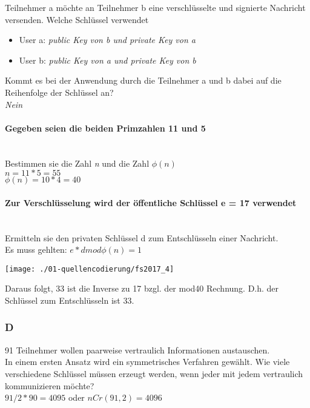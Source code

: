 Teilnehmer a möchte an Teilnehmer b eine verschlüsselte und signierte Nachricht versenden. Welche Schlüssel verwendet
\begin{itemize}
    \item User a: \textit{public Key von b und private Key von a}
    \item User b: \textit{public Key von a und private Key von b}\\
\end{itemize}

Kommt es bei der Anwendung durch die Teilnehmer a und b dabei auf die Reihenfolge der Schlüssel an?\\
\textit{Nein}\\

\paragraph{Gegeben seien die beiden Primzahlen 11 und 5}\mbox{}\\
Bestimmen sie die Zahl \textit{n} und die Zahl $\phi(n)$\\
$n=11*5=55$\\
$\phi(n) = 10*4=40$

\paragraph{Zur Verschlüsselung wird der öffentliche Schlüssel e  = 17 verwendet}\mbox{}\\
Ermitteln sie den privaten Schlüssel d zum Entschlüsseln einer Nachricht.\\
Es muss gehlten: $e*dmod\phi(n)=1$\\

\begin{center}
    \vspace{-8pt}
    \texttt{[image: ./01-quellencodierung/fs2017\_4]}
    \vspace{-8pt}
\end{center}

Daraus folgt, 33 ist die Inverse zu 17 bzgl. der mod40 Rechnung. D.h. der Schlüssel zum Entschlüsseln ist 33.

\subsubsection{D}
91 Teilnehmer wollen paarweise vertraulich Informationen austauschen.\\

In einem ersten Ansatz wird ein symmetrisches Verfahren gewählt. 
Wie viele verschiedene Schlüssel müssen erzeugt werden, wenn jeder mit jedem vertraulich kommunizieren möchte?\\
$91/2*90=4095$ oder $nCr(91,2)=4096$\\


